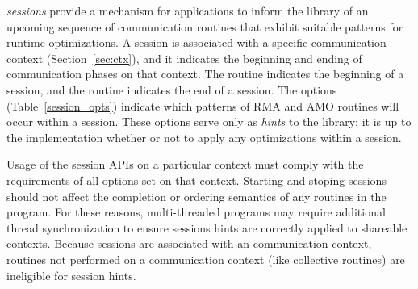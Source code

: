\openshmem \emph{sessions} provide a mechanism for applications to inform the
\openshmem library of an upcoming sequence of communication routines that
exhibit suitable patterns for runtime optimizations.
A session is associated with a specific \openshmem communication context
(Section~\ref{sec:ctx}), and it indicates the beginning and ending of
communication phases on that context.
The  routine indicates the beginning of a session,
and the  routine indicates the end of a session.
The  options (Table~\ref{session_opts}) indicate
which patterns of \openshmem RMA and AMO routines will occur within a session.
These options serve only as \textit{hints} to the library; it is up to the
implementation whether or not to apply any optimizations within a session.

Usage of the \openshmem session APIs on a particular context must comply with
the requirements of all options set on that context.
Starting and stoping \openshmem sessions should not affect the completion or
ordering semantics of any \openshmem routines in the program.
For these reasons, multi-threaded \openshmem programs may require additional
thread synchronization to ensure sessions hints are correctly applied to
shareable contexts.
Because sessions are associated with an \openshmem communication context,
routines not performed on a communication context (like collective routines)
are ineligible for session hints.
